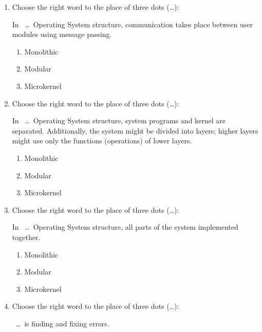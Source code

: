 \documentclass[paper=8.2in:11.6in]{scrartcl}
\begin{document}
\begin{enumerate}
\begin{enumerate}[label=\alph*)]
\end{enumerate}

\item Choose the right word to the place of three dots (\ldots):

In \ \ldots \ Operating System structure, communication takes place between user modules using message passing.

\begin{enumerate}[label=\alph*)]

\item Monolithic
\item Modular
\item Microkernel

\end{enumerate}

\item Choose the right word to the place of three dots (\ldots):

In \ \ldots \ Operating System structure, system programs and kernel are separated. Additionally, the system might be divided into layers; higher layers might use only the functions (operations) of lower layers.

\begin{enumerate}[label=\alph*)]

\item Monolithic
\item Modular
\item Microkernel

\end{enumerate}

\item Choose the right word to the place of three dots (\ldots):

In \ \ldots \ Operating System structure, all parts of the system implemented together.

\begin{enumerate}[label=\alph*)]

\item Monolithic
\item Modular
\item Microkernel

\end{enumerate}

\item Choose the right word to the place of three dots (\ldots):

\ \ldots \ is finding and fixing errors.

\begin{enumerate}[label=\alph*)]


\end{enumerate}
\end{enumerate}
\end{document}
